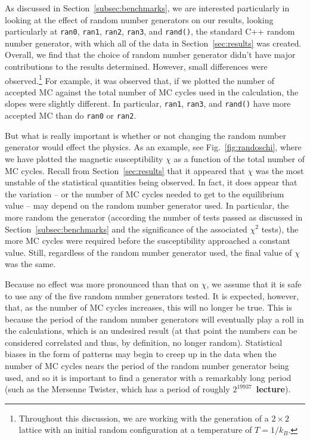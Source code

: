 \documentclass[12pt]{article}
\numberwithin{equation}{section}
\begin{document}
As discussed in Section~\ref{subsec:benchmarks}, we are interested particularly in looking at the effect of random number generators on our results, looking particularly at \texttt{ran0}, \texttt{ran1}, \texttt{ran2}, \texttt{ran3}, and \texttt{rand()}, the standard C++ random number generator, with which all of the data in Section~\ref{sec:results} was created.  Overall, we find that the choice of random number generator didn't have major contributions to the results determined.  However, small differences were observed.\footnote{Throughout this discussion, we are working with the generation of a $2\times2$ lattice with an initial random configuration at a temperature of $T=1/k_{B}$.}  For example, it was observed that, if we plotted the number of accepted MC against the total number of MC cycles used in the calculation, the slopes were slightly different.   In particular, \texttt{ran1}, \texttt{ran3}, and \texttt{rand()} have more accepted MC than do \texttt{ran0} or \texttt{ran2}.  
\par But what is really important is whether or not changing the random number generator would effect the physics.  As an example, see Fig.~\ref{fig:randoschi}, where we have plotted the magnetic susceptibility $\chi$ as a function of the total number of MC cycles.  Recall from Section~\ref{sec:results} that it appeared that $\chi$ was the most unstable of the statistical quantities being observed.  In fact, it does appear that the variation -- or the number of MC cycles needed to get to the equilibrium value -- may depend on the random number generator used.  In particular, the more random the generator (according the number of tests passed as discussed in Section~\ref{subsec:benchmarks} and the significance of the associated $\chi^{2}$ tests), the more MC cycles were required before the susceptibility approached a constant value.  Still, regardless of the random number generator used, the final value of $\chi$ was the same.  
\par Because no effect was more pronounced than that on $\chi$, we assume that it is safe to use any of the five random number generators tested.  It is expected, however, that, as the number of MC cycles increases, this will no longer be true.  This is because the period of the random number generators will eventually play a roll in the calculations, which is an undesired result (at that point the numbers can be considered correlated and thus, by definition, no longer random).  Statistical biases in the form of patterns may begin to creep up in the data when the number of MC cycles nears the period of the random number generator being used, and so it is important to find a generator with a remarkably long period (such as the Mersenne Twister, which has a period of roughly $2^{19937}$~\textbf{lecture}).
\end{document}
